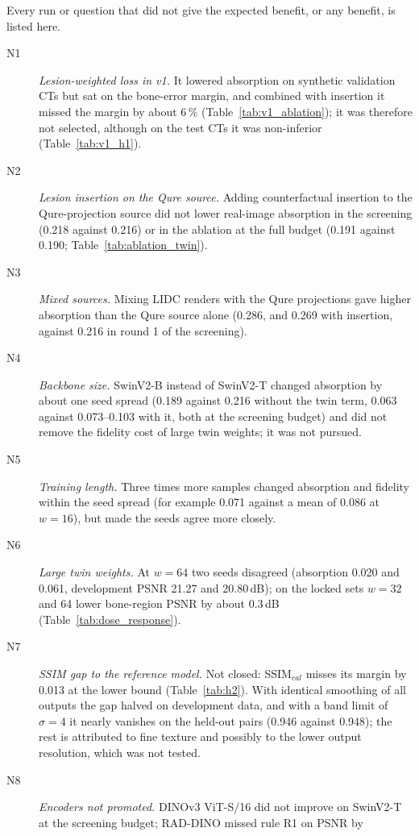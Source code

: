 Every run or question that did not give the expected benefit, or any benefit, is listed here.
\begin{description}
\item[N1] \emph{Lesion-weighted loss in v1.} It lowered absorption on synthetic validation CTs but sat on the bone-error margin, and combined
 with insertion it missed the margin by about 6\,\% (Table~\ref{tab:v1_ablation}); it was therefore not selected, although on the test CTs it
 was non-inferior (Table~\ref{tab:v1_h1}).
\item[N2] \emph{Lesion insertion on the Qure source.} Adding counterfactual insertion to the Qure-projection source did not lower real-image
 absorption in the screening (0.218 against 0.216) or in the ablation at the full budget (0.191 against 0.190; Table~\ref{tab:ablation_twin}).
\item[N3] \emph{Mixed sources.} Mixing LIDC renders with the Qure projections gave higher absorption than the Qure source alone (0.286, and 0.269
 with insertion, against 0.216 in round 1 of the screening).
\item[N4] \emph{Backbone size.} SwinV2-B instead of SwinV2-T changed absorption by about one seed spread (0.189 against 0.216 without the twin
 term, 0.063 against 0.073--0.103 with it, both at the screening budget) and did not remove the fidelity cost of large twin weights; it was not pursued.
\item[N5] \emph{Training length.} Three times more samples changed absorption and fidelity within the seed spread (for example 0.071 against
 a mean of 0.086 at $w=16$), but made the seeds agree more closely.
\item[N6] \emph{Large twin weights.} At $w=64$ two seeds disagreed (absorption 0.020 and 0.061, development PSNR 21.27 and 20.80\,dB); on the
 locked sets $w=32$ and 64 lower bone-region PSNR by about 0.3\,dB (Table~\ref{tab:dose_response}).
\item[N7] \emph{SSIM gap to the reference model.} Not closed: SSIM$_{cal}$ misses its margin by 0.013 at the lower bound (Table~\ref{tab:h2}).
 With identical smoothing of all outputs the gap halved on development data, and with a band limit of $\sigma=4$ it nearly vanishes on the held-out
 pairs (0.946 against 0.948); the rest is attributed to fine texture and possibly to the lower output resolution, which was not tested.
\item[N8] \emph{Encoders not promoted.} DINOv3 ViT-S/16 did not improve on SwinV2-T at the screening budget; RAD-DINO missed rule R1 on PSNR by

\end{description}
